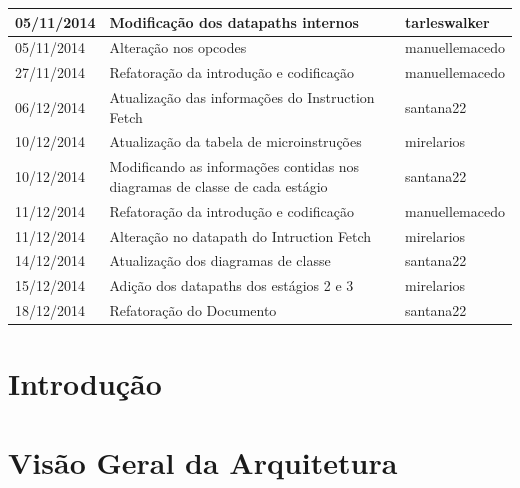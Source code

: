 \documentclass{report}
\begin{document}
\begin{longtable}[pos]{|m{2cm} | m{7.2cm} | m{3.8cm}|}
      \small 05/11/2014 & \small Modificação dos datapaths internos & \small tarleswalker \\ \hline
      \small 05/11/2014 & \small Alteração nos opcodes & \small manuellemacedo \\ \hline
      \small 27/11/2014 & \small Refatoração da introdução e codificação & \small manuellemacedo \\ \hline
      \small 06/12/2014 & \small Atualização das informações do Instruction Fetch & \small santana22 \\ \hline
      \small 10/12/2014 & \small Atualização da tabela de microinstruções  & \small mirelarios \\ \hline
      \small 10/12/2014 & \small Modificando as informações contidas nos diagramas de classe de cada estágio  & \small  santana22 \\ \hline
      \small 11/12/2014 & \small Refatoração da introdução e codificação & \small manuellemacedo \\ \hline
      \small 11/12/2014 & \small Alteração no datapath do Intruction Fetch  & \small mirelarios \\ \hline
      \small 14/12/2014 & \small Atualização dos diagramas de classe & \small santana22 \\ \hline
      \small 15/12/2014 & \small Adição dos datapaths dos estágios 2 e 3 & \small mirelarios \\ \hline
      \small 18/12/2014 & \small Refatoração do Documento & \small santana22 \\ \hline
	\end{longtable}

\tableofcontents

\chapter{Introdução}
  
	

\chapter{Visão Geral da Arquitetura}

%	
	
	
	
	
\end{document}
